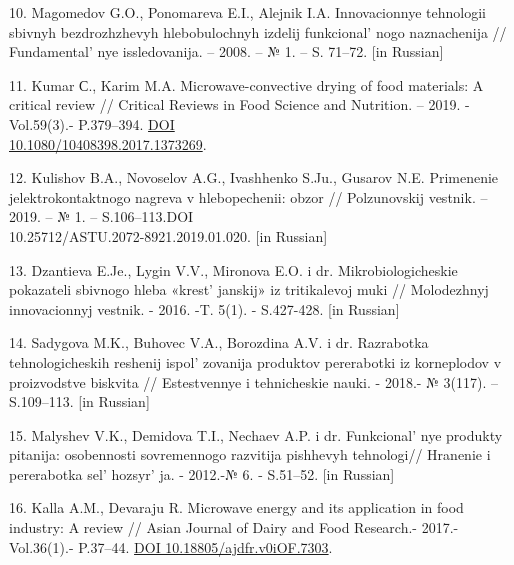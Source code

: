 \begin{references}
10. Magomedov G.O., Ponomareva E.I., Alejnik I.A. Innovacionnye
tehnologii sbivnyh bezdrozhzhevyh hlebobulochnyh izdelij
funkcional' nogo naznachenija //
Fundamental' nye issledovanija. -- 2008. -- № 1. -- S.
71--72. {[}in Russian{]}

11. Kumar С., Karim M.A. Microwave-convective drying of food materials: A
critical review // Critical Reviews in Food Science and Nutrition. --
2019. - Vol.59(3).- P.379--394.
\href{https://doi.org/10.1080/10408398.2017.1373269}{DOI\\
10.1080/10408398.2017.1373269}.

12. Kulishov B.A., Novoselov A.G., Ivashhenko S.Ju., Gusarov N.E.
Primenenie jelektrokontaktnogo nagreva v hlebopechenii: obzor //
Polzunovskij vestnik. -- 2019. -- № 1. -- S.106--113.DOI\\
10.25712/ASTU.2072-8921.2019.01.020. {[}in Russian{]}

13. Dzantieva E.Je., Lygin V.V., Mironova E.O. i dr. Mikrobiologicheskie
pokazateli sbivnogo hleba «krest' janskij» iz
tritikalevoj muki // Molodezhnyj innovacionnyj vestnik. - 2016. -T.
5(1). - S.427-428. {[}in Russian{]}

14. Sadygova M.K., Buhovec V.A., Borozdina A.V. i dr. Razrabotka
tehnologicheskih reshenij ispol' zovanija produktov
pererabotki iz korneplodov v proizvodstve biskvita // Estestvennye i
tehnicheskie nauki. - 2018.- № 3(117). -- S.109--113. {[}in Russian{]}

15. Malyshev V.K., Demidova T.I., Nechaev A.P. i dr.
Funkcional' nye produkty pitanija: osobennosti
sovremennogo razvitija pishhevyh tehnologi// Hranenie i pererabotka
sel' hozsyr' ja. - 2012.-№ 6. - S.51--52.
{[}in Russian{]}

16. Kalla A.M., Devaraju R. Microwave energy and its application in food
industry: A review // Asian Journal of Dairy and Food Research.- 2017.-
Vol.36(1).- P.37--44.
\href{https://doi.org/10.18805/ajdfr.v0iOF.7303}{DOI
10.18805/ajdfr.v0iOF.7303}.
\end{references}

